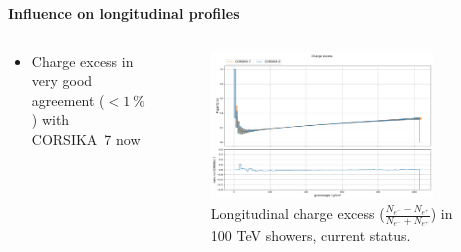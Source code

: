 \documentclass[aspectratio=1610, 9pt]{beamer}
\begin{document}
\begin{frame}

  \textbf{Influence on longitudinal profiles}
  \vspace{5mm}

    \begin{columns}[onlytextwidth]
        \begin{column}{0.4\textwidth}
            \begin{itemize}
              \item Charge excess in very good agreement ($< \SI{1}{\percent}$) with CORSIKA~7 now
            \end{itemize}
        \end{column}
        \begin{column}{0.6\textwidth}
            \begin{figure}
                \centering
                \includegraphics[width=0.85\textwidth]{plots/charge_excess_2023.png}
                \caption{Longitudinal charge excess ($\frac{N_{e^-} - N_{e^+}}{N_{e^-} + N_{e^+}}$) in 100 \si{\tera\electronvolt} showers, current status.}
            \end{figure}
        \end{column}
    \end{columns}
\end{frame}
\end{document}
